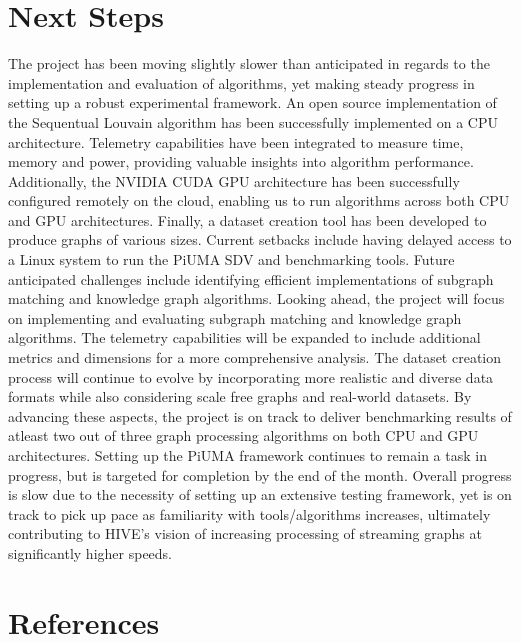 \documentclass[letterpaper, 10pt]{article}
\begin{document}
\begin{multicols}{2}
{    \section{Next Steps}\label{section:nextSteps}
        The project has been moving slightly slower than anticipated in regards to the implementation and evaluation of algorithms, yet making steady progress in setting up a robust experimental framework.
        An open source implementation of the Sequentual Louvain algorithm has been successfully implemented on a CPU architecture. 
        Telemetry capabilities have been integrated to measure time, memory and power, providing valuable insights into algorithm performance. 
        Additionally, the NVIDIA CUDA GPU architecture has been successfully configured remotely on the cloud, enabling us to run algorithms across both CPU and GPU architectures. 
        Finally, a dataset creation tool has been developed to produce graphs of various sizes. 
        Current setbacks include having delayed access to a Linux system to run the PiUMA SDV and benchmarking tools. 
        Future anticipated challenges include identifying efficient implementations of subgraph matching and knowledge graph algorithms. 
        Looking ahead, the project will focus on implementing and evaluating subgraph matching and knowledge graph algorithms. 
        The telemetry capabilities will be expanded to include additional metrics and dimensions for a more comprehensive analysis. 
        The dataset creation process will continue to evolve by incorporating more realistic and diverse data formats while also considering scale free graphs and real-world datasets. 
        By advancing these aspects, the project is on track to deliver benchmarking results of atleast two out of three graph processing algorithms on both CPU and GPU architectures. 
        Setting up the PiUMA framework continues to remain a task in progress, but is targeted for completion by the end of the month.
        Overall progress is slow due to the necessity of setting up an extensive testing framework, yet is on track to pick up pace as familiarity with tools/algorithms increases, ultimately contributing to HIVE's vision of increasing processing of streaming graphs at significantly higher speeds. 
        
    \section{References}
        \printbibliography[heading=none]

}
\end{multicols}
\end{document}
